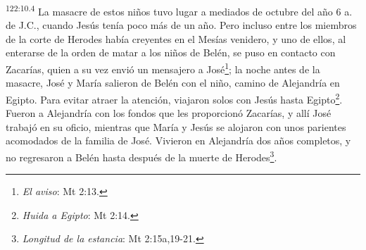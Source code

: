 \par
\textsuperscript{122:10.4} La masacre de estos niños tuvo lugar a mediados de octubre del año 6 a. de J.C., cuando Jesús tenía poco más de un año. Pero incluso entre los miembros de la corte de Herodes había creyentes en el Mesías venidero, y uno de ellos, al enterarse de la orden de matar a los niños de Belén, se puso en contacto con Zacarías, quien a su vez envió un mensajero a José\footnote{\textit{El aviso}: Mt 2:13.}; la noche antes de la masacre, José y María salieron de Belén con el niño, camino de Alejandría en Egipto. Para evitar atraer la atención, viajaron solos con Jesús hasta Egipto\footnote{\textit{Huida a Egipto}: Mt 2:14.}. Fueron a Alejandría con los fondos que les proporcionó Zacarías, y allí José trabajó en su oficio, mientras que María y Jesús se alojaron con unos parientes acomodados de la familia de José. Vivieron en Alejandría dos años completos, y no regresaron a Belén hasta después de la muerte de Herodes\footnote{\textit{Longitud de la estancia}: Mt 2:15a,19-21.}.